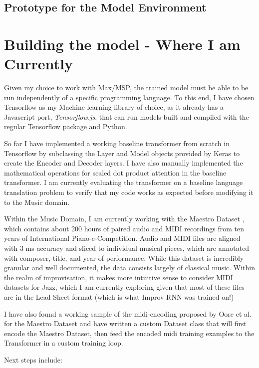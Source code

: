 \documentclass[../main.tex]{subfiles}
\begin{document}
\subsection{Prototype for the Model Environment}


\section{Building the model - Where I am Currently}

Given my choice to work with Max/MSP, the trained model must be able to be run independently of a specific programming language. To this end, I have chosen Tensorflow as my Machine learning library of choice, as it already has a Javascript port, \textit{Tensorflow.js}, that can run models built and compiled with the regular Tensorflow package and Python.

So far I have implemented a working baseline transformer from scratch in Tensorflow by subclassing the Layer and Model objects provided by Keras to create the Encoder and Decoder layers. I have also manually implemented the mathematical operations for scaled dot product attention in the baseline transformer. I am currently evaluating the transformer on a baseline language translation problem to verify that my code works as expected before modifying it to the Music domain. 

Within the Music Domain, I am currently working with the Maestro Dataset \cite{maestro}, which contains about 200 hours of paired audio and MIDI recordings from ten years of International Piano-e-Competition. Audio and MIDI files are aligned with 3 ms accuracy and sliced to individual musical pieces, which are annotated with composer, title, and year of performance. While this dataset is incredibly granular and well documented, the data consists largely of classical music. Within the realm of improvisation, it makes more intuitive sense to consider MIDI datasets for Jazz, which I am currently exploring given that most of these files are in the Lead Sheet format (which is what Improv RNN was trained on!)

I have also found a working sample of the midi-encoding proposed by Oore et al. for the Maestro Dataset and have written a custom Dataset class that will first encode the Maestro Dataset, then feed the encoded midi training examples to the Transformer in a custom training loop.

Next steps include:
\end{document}
